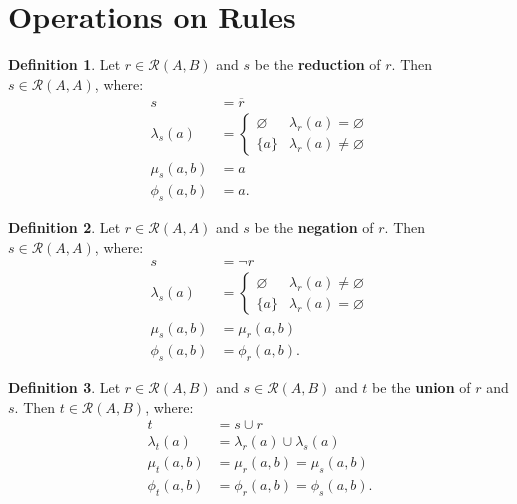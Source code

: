 \documentclass{article}
\theoremstyle{definition}
\newtheorem{definition}{Definition}[section]
\theoremstyle{plain}
\def\rule{\mathcal{R}}
\begin{document}
\section{Operations on Rules}
\begin{definition}
  Let $ r \in \rule (A, B) $
  and $ s $ be the \textbf{reduction} of $ r $.
  Then $ s \in \rule (A, A) $, where:
  \begin{align}
            s        & = \overline{r} \\
    \lambda_s (a)    & = \begin{cases}
                           \varnothing & \lambda_r (a) = \varnothing \\
                           \{ a \}     & \lambda_r (a) \neq \varnothing
                         \end{cases} \\
        \mu_s (a, b) & = a \\
       \phi_s (a, b) & = a.
  \end{align}
\end{definition}

\begin{definition}
  Let $ r \in \rule (A, A) $
  and $ s $ be the \textbf{negation} of $ r $.
  Then $ s \in \rule (A, A) $, where:
  \begin{align}
            s        & = \neg r \\
    \lambda_s (a)    & = \begin{cases}
                           \varnothing & \lambda_r (a) \neq \varnothing \\
                           \{ a \}     & \lambda_r (a) = \varnothing
                         \end{cases} \\
        \mu_s (a, b) & =  \mu_r (a, b) \\
       \phi_s (a, b) & = \phi_r (a, b).
  \end{align}
\end{definition}

\begin{definition}
  Let $ r \in \rule (A, B) $
  and $ s \in \rule (A, B) $
  and $ t $ be the \textbf{union} of $ r $ and $ s $.
  Then $ t \in \rule (A, B) $, where:
  \begin{align}
            t        & = s \cup r \\
    \lambda_t (a)    & = \lambda_r (a) \cup \lambda_s (a) \\
        \mu_t (a, b) & = \mu_r  (a, b)    = \mu_s  (a, b) \\
       \phi_t (a, b) & = \phi_r (a, b)    = \phi_s (a, b).
  \end{align}
\end{definition}
\end{document}
